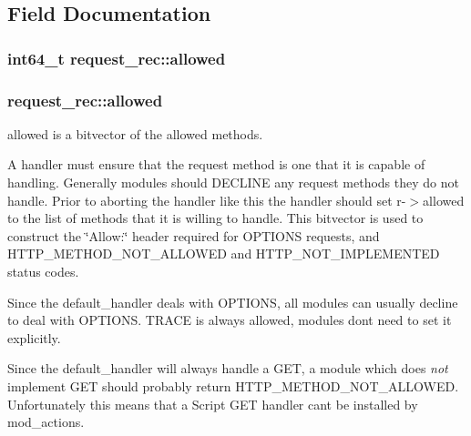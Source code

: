 \subsection{Field Documentation}
\subsubsection[{\texorpdfstring{allowed}{allowed}}]{\setlength{\rightskip}{0pt plus 5cm}int64\+\_\+t request\+\_\+rec\+::allowed}\hypertarget{structrequest__rec_a106d46c4b12825895e1e7878a2c5fe24}{}\label{structrequest__rec_a106d46c4b12825895e1e7878a2c5fe24}
\subsubsection[{\texorpdfstring{allowed}{allowed}}]{ request\+\_\+rec\+::allowed}\hypertarget{structrequest__rec_ac3f24ef04a6c014e19496f85c74e2f88}{}\label{structrequest__rec_ac3f24ef04a6c014e19496f85c74e2f88}
\textquotesingle{}allowed\textquotesingle{} is a bitvector of the allowed methods.

A handler must ensure that the request method is one that it is capable of handling. Generally modules should D\+E\+C\+L\+I\+NE any request methods they do not handle. Prior to aborting the handler like this the handler should set r-\/$>$allowed to the list of methods that it is willing to handle. This bitvector is used to construct the \char`\"{}\+Allow\+:\char`\"{} header required for O\+P\+T\+I\+O\+NS requests, and H\+T\+T\+P\+\_\+\+M\+E\+T\+H\+O\+D\+\_\+\+N\+O\+T\+\_\+\+A\+L\+L\+O\+W\+ED and H\+T\+T\+P\+\_\+\+N\+O\+T\+\_\+\+I\+M\+P\+L\+E\+M\+E\+N\+T\+ED status codes.

Since the default\+\_\+handler deals with O\+P\+T\+I\+O\+NS, all modules can usually decline to deal with O\+P\+T\+I\+O\+NS. T\+R\+A\+CE is always allowed, modules don\textquotesingle{}t need to set it explicitly.

Since the default\+\_\+handler will always handle a G\+ET, a module which does {\itshape not} implement G\+ET should probably return H\+T\+T\+P\+\_\+\+M\+E\+T\+H\+O\+D\+\_\+\+N\+O\+T\+\_\+\+A\+L\+L\+O\+W\+ED. Unfortunately this means that a Script G\+ET handler can\textquotesingle{}t be installed by mod\+\_\+actions. 
